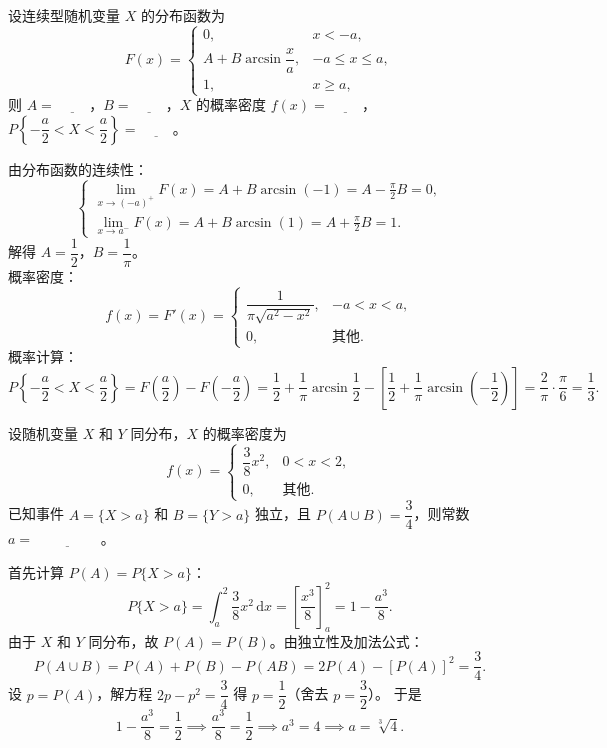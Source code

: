 ﻿\documentclass[lang=cn,11pt]{elegantbook}
\begin{document}
\begin{exercise}[反正弦分布] \label{exer:2-38}
设连续型随机变量 $X$ 的分布函数为
\[
F(x)=
\begin{cases}
0, & x<-a, \\[6pt]
A+B\arcsin\dfrac{x}{a}, & -a\leqslant x\leqslant a, \\[6pt]
1, & x\geqslant a,
\end{cases}
\]
则 $A=\underline{\hspace{1cm}}$，$B=\underline{\hspace{1cm}}$，$X$ 的概率密度 $f(x)=\underline{\hspace{1cm}}$，$P\left\{-\dfrac{a}{2}<X<\dfrac{a}{2}\right\}=\underline{\hspace{1cm}}$。
\end{exercise}
\begin{solution}
由分布函数的连续性：
\[
\begin{cases}
\displaystyle\lim_{x\to(-a)^+}F(x) = A+B\arcsin(-1) = A-\frac{\pi}{2}B = 0, \\[10pt]
\displaystyle\lim_{x\to a^-}F(x) = A+B\arcsin(1) = A+\frac{\pi}{2}B = 1.
\end{cases}
\]
解得 $A=\dfrac{1}{2}$，$B=\dfrac{1}{\pi}$。\\
概率密度：
\[
f(x) = F'(x) = 
\begin{cases}
\dfrac{1}{\pi\sqrt{a^2-x^2}}, & -a<x<a, \\[6pt]
0, & \text{其他}.
\end{cases}
\]
概率计算：
\[
P\left\{-\frac{a}{2}<X<\frac{a}{2}\right\} = F\left(\frac{a}{2}\right)-F\left(-\frac{a}{2}\right) = \frac{1}{2}+\frac{1}{\pi}\arcsin\frac{1}{2} - \left[\frac{1}{2}+\frac{1}{\pi}\arcsin\left(-\frac{1}{2}\right)\right] = \frac{2}{\pi}\cdot\frac{\pi}{6} = \frac{1}{3}.
\]
\end{solution}


\begin{exercise}[同分布随机变量参数求解] \label{exer:2-42}
设随机变量 $X$ 和 $Y$ 同分布，$X$ 的概率密度为
\[
f(x)=
\begin{cases}
\dfrac{3}{8}x^2, & 0<x<2, \\[6pt]
0, & \text{其他}.
\end{cases}
\]
已知事件 $A=\{X>a\}$ 和 $B=\{Y>a\}$ 独立，且 $P(A\cup B)=\dfrac{3}{4}$，则常数 $a=\underline{\hspace{2cm}}$。
\end{exercise}
\begin{solution}
首先计算 $P(A)=P\{X>a\}$：
\[
P\{X>a\} = \int_a^2 \frac{3}{8}x^2\,\mathrm{d}x = \left[\frac{x^3}{8}\right]_a^2 = 1 - \frac{a^3}{8}.
\]
由于 $X$ 和 $Y$ 同分布，故 $P(A)=P(B)$。由独立性及加法公式：
\[
P(A\cup B) = P(A) + P(B) - P(AB) = 2P(A) - [P(A)]^2 = \frac{3}{4}.
\]
设 $p=P(A)$，解方程 $2p-p^2=\dfrac{3}{4}$ 得 $p=\dfrac{1}{2}$（舍去 $p=\dfrac{3}{2}$）。
于是
\[
1 - \frac{a^3}{8} = \frac{1}{2} \implies \frac{a^3}{8} = \frac{1}{2} \implies a^3 = 4 \implies a = \sqrt[3]{4}.
\]
\end{solution}
\end{document}
